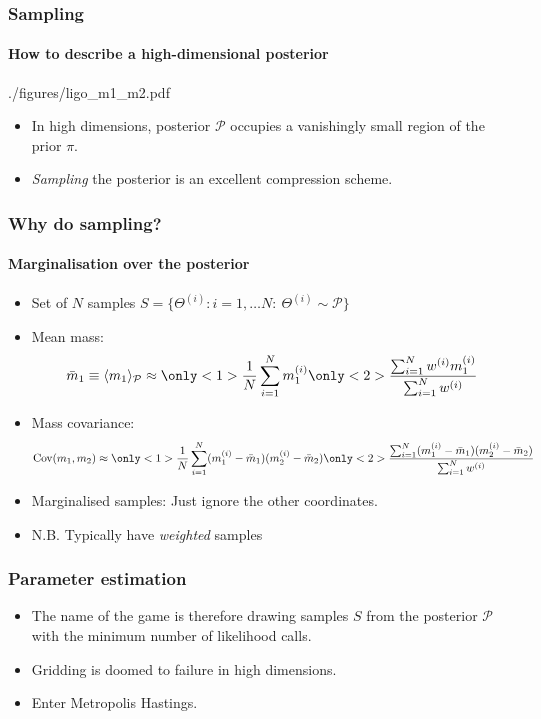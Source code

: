 \documentclass[%
]{beamer}
\newcommand{\posterior}{\mathcal{P}}
\newcommand{\prior}{\pi}
\begin{document}
\begin{frame}
    \frametitle{Sampling}
    \framesubtitle{How to describe a high-dimensional posterior}

	\begin{figright}{./figures/ligo_m1_m2.pdf}
		\begin{itemize}
          \item In high dimensions, posterior $\posterior$ occupies a vanishingly small region of the prior $\prior$.
          \item {\em Sampling\/} the posterior is an excellent compression scheme.
		\end{itemize}
	\end{figright}
 
\end{frame}
%
\begin{frame}
    \frametitle{Why do sampling?}
    \framesubtitle{Marginalisation over the posterior}

    \begin{itemize}
        \item Set of $N$ samples $S = \{\Theta^{(i)}: i=1,\ldots N:\: \Theta^{(i)}\sim\mathcal{P}\}$
        \item Mean mass: \[
                \bar{m}_1 \equiv\langle m_1\rangle_\mathcal{P} \approx 
                \only<1>{\frac{1}{N}\sum_{i=1}^N m_1^{(i)}}
                \only<2>{\frac{\sum_{i=1}^N w^{(i)} m_1^{(i)}}{\sum_{i=1}^N w^{(i)}}}
            \]
        \item Mass covariance: \[
                \mathrm{Cov}(m_1,m_2) \approx 
                \only<1>{\frac{1}{N}\sum_{i=1}^N (m_1^{(i)}-\bar{m}_1)(m_2^{(i)}-\bar{m}_2)}
                \only<2>{\frac{\sum_{i=1}^N (m_1^{(i)}-\bar{m}_1)(m_2^{(i)}-\bar{m}_2)}{\sum_{i=1}^N w^{(i)}}}
            \]
        \item Marginalised samples: Just ignore the other coordinates.
        \item N.B. Typically have {\em weighted\/} samples
    \end{itemize}
\end{frame}
%
\begin{frame}
    \frametitle{Parameter estimation}
    \begin{itemize}
        \item The name of the game is therefore drawing samples $S$ from the posterior $\mathcal{P}$ with the minimum number of likelihood calls.
        \item Gridding is doomed to failure in high dimensions.
        \item Enter Metropolis Hastings.
    \end{itemize}
\end{frame}
\end{document}
